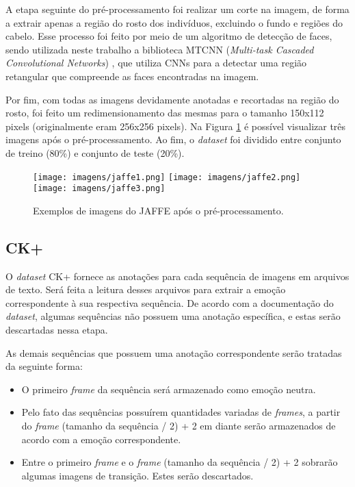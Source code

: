 \documentclass[
12pt,       %
openright,      %
oneside,      %
a4paper,      %
english,      %
french,       %
spanish,      %
brazil        %
]{abntex2}
\begin{document}
A etapa seguinte do pré-processamento foi realizar um corte na imagem, de forma a extrair apenas a região do rosto dos indivíduos, excluindo o fundo e regiões do cabelo. Esse processo foi feito por meio de um algoritmo de detecção de faces, sendo utilizada neste trabalho a biblioteca MTCNN (\textit{Multi-task Cascaded Convolutional Networks}) , que utiliza CNNs para a detectar uma região retangular que compreende as faces encontradas na imagem.

Por fim, com todas as imagens devidamente anotadas e recortadas na região do rosto, foi feito um redimensionamento das mesmas para o tamanho 150x112 pixels (originalmente eram 256x256 pixels).  Na Figura \ref{fig:jaffe_group} é possível visualizar três imagens após o pré-processamento. Ao fim, o \textit{dataset} foi dividido entre conjunto de treino (80\%) e conjunto de teste (20\%).

\begin{figure}[ht]
\centering
\caption{Exemplos de imagens do JAFFE após o pré-processamento.}
\texttt{[image: imagens/jaffe1.png]}
\texttt{[image: imagens/jaffe2.png]}
\texttt{[image: imagens/jaffe3.png]}
\label{fig:jaffe_group}
\end{figure}

\subsection{CK+} \label{preprocessamento-ck+}

O \textit{dataset} CK+ fornece as anotações para cada sequência de imagens em arquivos de texto. Será feita a leitura desses arquivos para extrair a emoção correspondente à sua respectiva sequência. De acordo com a documentação do \textit{dataset}, algumas sequências não possuem uma anotação específica, e estas serão descartadas nessa etapa.

As demais sequências que possuem uma anotação correspondente serão tratadas da seguinte forma:

\begin{itemize}
    \item O primeiro \textit{frame} da sequência será armazenado como emoção neutra.
    \item Pelo fato das sequências possuírem quantidades variadas de \textit{frames}, a partir do \textit{frame} (tamanho da sequência / 2) + 2 em diante serão armazenados de acordo com a emoção correspondente.
    \item Entre o primeiro \textit{frame} e o \textit{frame} (tamanho da sequência / 2) + 2 sobrarão algumas imagens de transição. Estes serão descartados.
\end{itemize}
\end{document}
